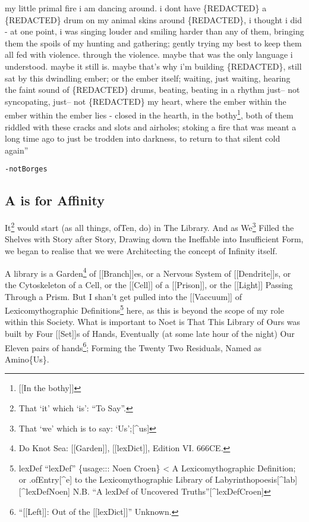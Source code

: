 \documentclass[
]{article}
\begin{document}
{my little primal fire i am dancing around. i dont have \{REDACTED\} a
\{REDACTED\} drum on my animal skins around \{REDACTED\}, i thought i
did - at one point, i was singing louder and smiling harder than any of
them, bringing them the spoils of my hunting and gathering; gently
trying my best to keep them all fed with violence. through the violence.
maybe that was the only language i understood. maybe it still is. maybe
that's why i'm building \{REDACTED\}, still sat by this dwindling ember;
or the ember itself; waiting, just waiting, hearing the faint sound of
\{REDACTED\} drums, beating, beating in a rhythm just-- not syncopating,
just-- not \{REDACTED\} my heart, where the ember within the ember
within the ember lies - closed in the hearth, in the bothy\footnote{{[}{[}In
  the bothy{]}{]}}, both of them riddled with these cracks and slots and
airholes; stoking a fire that was meant a long time ago to just be
trodden into darkness, to return to that silent cold again}''

\begin{verbatim}
-notBorges
\end{verbatim}

\subsection{A is for Affinity}\label{a-is-for-affinity}

It\footnote{That `it' which `is': ``To Say''.} would start (as all
things, ofTen, do) in The Library. And as We\footnote{That `we' which is
  to say: `Us';{[}\^{}us{]}} Filled the Shelves with Story after Story,
Drawing down the Ineffable into Insufficient Form, we began to realise
that we were Architecting the concept of Infinity itself.

A library is a Garden\footnote{Do Knot Sea: {[}{[}Garden{]}{]},
  {[}{[}lexDict{]}{]}, Edition VI. 666CE.} of {[}{[}Branch{]}{]}es, or a
Nervous System of {[}{[}Dendrite{]}{]}s, or the Cytoskeleton of a Cell,
or the {[}{[}Cell{]}{]} of a {[}{[}Prison{]}{]}, or the
{[}{[}Light{]}{]} Passing Through a Prism. But I shan't get pulled into
the {[}{[}Vaccuum{]}{]} of Lexicomythographic Definitions\footnote{lexDef
  ``lexDef'' \{usage::: Noen \textbar\textbar{} Croen\} \textless{} A
  Lexicomythographic Definition; or .ofEntry{[}\^{}e{]} to the
  Lexicomythographic Library of
  Labyrinthopoesis{[}\^{}lab{]}{[}\^{}lexDefNoen{]} \textbar\textbar{}
  N.B. ``A lexDef of Uncovered Truths''{[}\^{}lexDefCroen{]}} here, as
this is beyond the scope of my role within this Society. What is
important to Noet is That This Library of Ours was built by Four
{[}{[}Set{]}{]}s of Hands, Eventually (at some late hour of the night)
Our Eleven pairs of hands\footnote{``{[}{[}Left{]}{]}: Out of the
  {[}{[}lexDict{]}{]}'' Unknown.}; Forming the Twenty Two Residuals,
Named as Amino\{Us\}.
\end{document}
